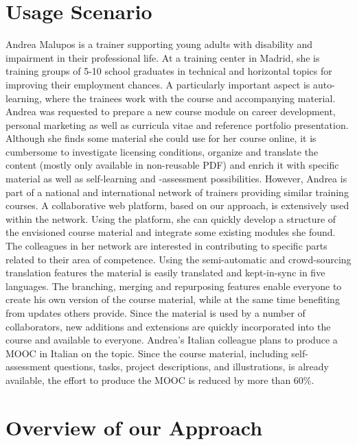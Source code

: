 \documentclass[ngerman,UKenglish,table]{scrbook}
\begin{document}
\section{Usage Scenario}  
Andrea Malupos is a trainer supporting young adults with disability and impairment in their professional life.
At a training center in Madrid, she is training groups of 5-10 school graduates in technical and horizontal topics for improving their employment chances.
A particularly important aspect is auto-learning, where the trainees work with the course and accompanying material.
Andrea was requested to prepare a new course module on career development, personal marketing as well as curricula vitae and reference portfolio presentation.
Although she finds some material she could use for her course online, it is cumbersome to investigate licensing conditions, organize and translate the content (mostly only available in non-reusable PDF) and enrich it with specific material as well as self-learning and -assessment possibilities.
However, Andrea is part of a national and international network of trainers providing similar training courses.
A collaborative web platform, based on our approach, is extensively used within the network.
Using the platform, she can quickly develop a structure of the envisioned course material and integrate some existing modules she found.
The colleagues in her network are interested in contributing to specific parts related to their area of competence. 
Using the semi-automatic and crowd-sourcing translation features the material is easily translated and kept-in-sync in five languages.
The branching, merging and repurposing features enable everyone to create his own version of the course material, while at the same time benefiting from updates others provide.
Since the material is used by a number of collaborators, new additions and extensions are quickly incorporated into the course and available to everyone.
Andrea's Italian colleague plans to produce a MOOC in Italian on the topic.
Since the course material, including self-assessment questions, tasks, project descriptions, and illustrations, is already available, the effort to produce the MOOC is reduced by more than 60\%.

\section{Overview of our Approach}
\label{section:approach_overview}
\end{document}
